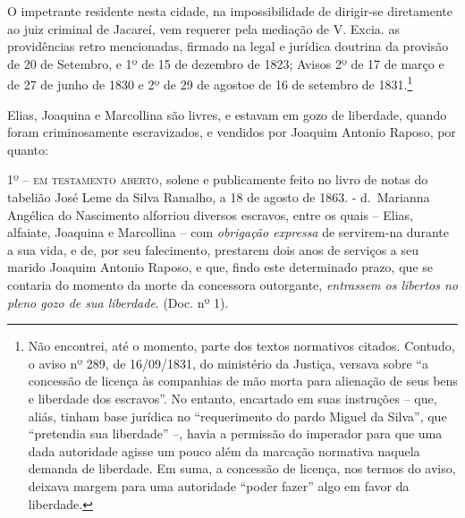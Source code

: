 O impetrante residente nesta cidade, na impossibilidade de dirigir-se
diretamente ao juiz criminal de Jacareí, vem requerer pela mediação de
V. Excia. as providências retro mencionadas, firmado na legal e jurídica
doutrina da provisão de 20 de Setembro, e 1º de 15 de dezembro de 1823;
Avisos 2º de 17 de março e de 27 de junho de 1830 e 2º de 29 de agostoe
de 16 de setembro de 1831.\footnote{ Não encontrei, até o momento,
  parte dos textos normativos citados. Contudo, o aviso nº 289, de
  16/09/1831, do ministério da Justiça, versava sobre ``a concessão de
  licença às companhias de mão morta para alienação de seus bens e
  liberdade dos escravos''. No entanto, encartado em suas instruções --
  que, aliás, tinham base jurídica no ``requerimento do pardo Miguel da
  Silva'', que ``pretendia sua liberdade'' --, havia a permissão do
  imperador para que uma dada autoridade agisse um pouco além da
  marcação normativa naquela demanda de liberdade. Em suma, a concessão
  de licença, nos termos do aviso, deixava margem para uma autoridade
  ``poder fazer'' algo em favor da liberdade.}

Elias, Joaquina e Marcollina são livres, e estavam em gozo de liberdade,
quando foram criminosamente escravizados, e vendidos por Joaquim Antonio
Raposo, por quanto:

1º -- \textsc{em testamento aberto}, solene e publicamente feito no livro de
notas do tabelião José Leme da Silva Ramalho, a 18 de agosto de 1863. -
d.~Marianna Angélica do Nascimento alforriou diversos escravos, entre os
quais -- Elias, alfaiate, Joaquina e Marcollina -- com \emph{obrigação
expressa} de servirem-na durante a sua vida, e de, por seu falecimento,
prestarem dois anos de serviços a seu marido Joaquim Antonio Raposo, e
que, findo este determinado prazo, que se contaria do momento da morte
da concessora outorgante, \emph{entrassem os libertos no pleno gozo de
sua liberdade}. (Doc. nº 1).

